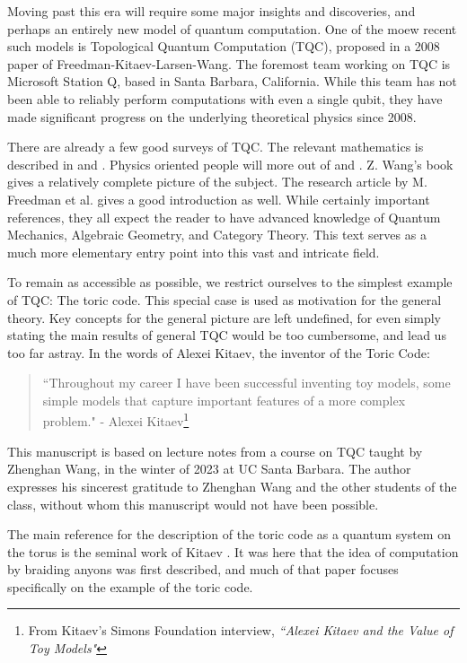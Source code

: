 \documentclass{article}
\theoremstyle{definition}
\numberwithin{figure}{section}
\begin{document}
Moving past this era will require some major insights and discoveries, and perhaps an entirely new model of quantum computation. One of the moew recent such models is Topological Quantum Computation (TQC), proposed in a 2008 paper of Freedman-Kitaev-Larsen-Wang. The foremost team working on TQC is Microsoft Station Q, based in Santa Barbara, California. While this team has not been able to reliably perform computations with even a single qubit, they have made significant progress on the underlying theoretical physics since 2008.

There are already a few good surveys of TQC. The relevant mathematics is described in \cite{bakalov2001lectures} and  \cite{rowell2018mathematics}. Physics oriented people will more out of \cite{preskill1999lecture} and \cite{nayak2008non}. Z. Wang's book \cite{wang2010topological} gives a relatively complete picture of the subject. The research article by M. Freedman et al. \cite{freedman2002simulation} gives a good introduction as well. While certainly important references, they all expect the reader to have advanced knowledge of Quantum Mechanics, Algebraic Geometry, and Category Theory. This text serves as a much more elementary entry point into this vast and intricate field.

To remain as accessible as possible, we restrict ourselves to the simplest example of TQC: The toric code. This special case is used as motivation for the general theory. Key concepts for the general picture are left undefined, for even simply stating the main results of general TQC would be too cumbersome, and lead us too far astray. In the words of Alexei Kitaev, the inventor of the Toric Code:

\begin{quote}
``Throughout my career I have been successful inventing toy models, some simple models that capture important features of a more complex problem." - Alexei Kitaev\footnote{From Kitaev's Simons Foundation interview, \textit{``Alexei Kitaev and the Value of Toy Models"}}
\end{quote}

This manuscript is based on lecture notes from a course on TQC taught by Zhenghan Wang, in the winter of 2023 at UC Santa Barbara. The author expresses his sincerest gratitude to Zhenghan Wang and the other students of the class, without whom this manuscript would not have been possible.

The main reference for the description of the toric code as a quantum system on the torus is the seminal work of Kitaev \cite{kitaev2003fault}. It was here that the idea of computation by braiding anyons was first described, and much of that paper focuses specifically on the example of the toric code.
\end{document}
